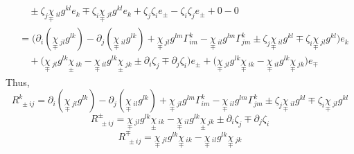 \documentclass[a4paper,11pt]{article}
\numberwithin{equation}{section}
\theoremstyle{definition}
\begin{document}
\begin{align*}
    &\quad \pm \zeta_j\underset{\mp}{\chi}\,_{il}g^{kl} e_k
    \mp \zeta_i\underset{\mp}{\chi}\,_{jl}g^{kl} e_k + \zeta_j\zeta_i e_\pm - \zeta_i\zeta_j e_\pm + 0 - 0\\
    &= \Big(\partial_i (\underset{\mp}{\chi}\,_{jl}g^{lk}) - \partial_j(\underset{\mp}{\chi}\,_{il}g^{lk}) + \underset{\mp}{\chi}\,_{jl}g^{lm} \Gamma_{im}^k - \underset{\mp}{\chi}\,_{il}g^{lm}\Gamma_{jm}^k \pm \zeta_j\underset{\mp}{\chi}\,_{il}g^{kl} \mp \zeta_i\underset{\mp}{\chi}\,_{jl}g^{kl} \Big)e_k \\
    &\quad  + \Big(\underset{\mp}{\chi}\,_{jl}g^{lk} \underset{\pm}{\chi}\,_{ik} - \underset{\mp}{\chi}\,_{il}g^{lk}\underset{\pm}{\chi}\,_{jk} \pm \partial_i \zeta_j \mp \partial_j\zeta_i \Big)e_\pm + \Big(\underset{\mp}{\chi}\,_{jl}g^{lk} \underset{\mp}{\chi}\,_{ik} - \underset{\mp}{\chi}\,_{il}g^{lk}\underset{\mp}{\chi}\,_{jk} \Big)e_\mp
\end{align*}
Thus,
\begin{equation}
    \boxed{R^k_{\;\pm ij} =\partial_i (\underset{\mp}{\chi}\,_{jl}g^{lk}) - \partial_j(\underset{\mp}{\chi}\,_{il}g^{lk}) + \underset{\mp}{\chi}\,_{jl}g^{lm} \Gamma_{im}^k - \underset{\mp}{\chi}\,_{il}g^{lm}\Gamma_{jm}^k \pm \zeta_j\underset{\mp}{\chi}\,_{il}g^{kl} \mp \zeta_i\underset{\mp}{\chi}\,_{jl}g^{kl}}
\end{equation}
\begin{equation}
    \boxed{R^\pm_{\;\pm ij}=\underset{\mp}{\chi}\,_{jl}g^{lk} \underset{\pm}{\chi}\,_{ik} - \underset{\mp}{\chi}\,_{il}g^{lk}\underset{\pm}{\chi}\,_{jk} \pm \partial_i \zeta_j \mp \partial_j\zeta_i}
\end{equation}
\begin{equation}
    \boxed{R^\mp_{\;\pm ij}=\underset{\mp}{\chi}\,_{jl}g^{lk} \underset{\mp}{\chi}\,_{ik} - \underset{\mp}{\chi}\,_{il}g^{lk}\underset{\mp}{\chi}\,_{jk}}
\end{equation}
\end{document}
